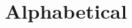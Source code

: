 \documentclass[12pt,twoside,openright,a4paper]{book}
\newcommand*{\PRINTED}{}	%
\begin{document}
\ifdefined\PRINTED

\section{Alphabetical}

\renewcommand{\FlagsSee}[1]{}	%

\end{document}
